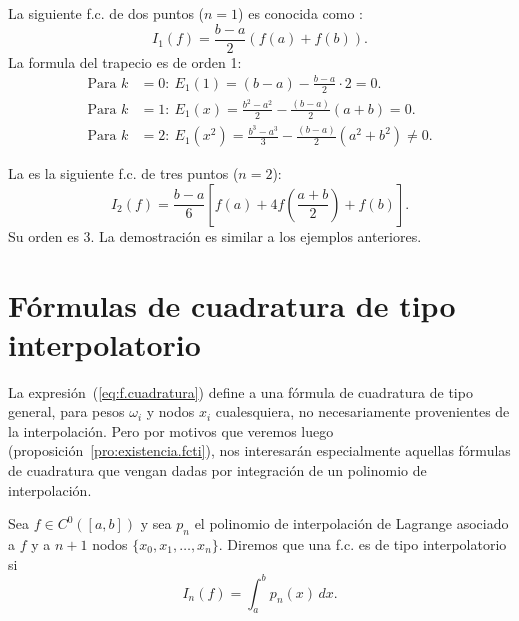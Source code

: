 \begin{example}
  \label{ex:formula-trapecio}
  La siguiente f.c. de dos puntos ($n=1$) es conocida
  como :
  \begin{equation*}
    I_1(f)= \frac{b-a}{2}\left(f(a)+f(b)\right).
  \end{equation*}
  La formula del trapecio es de orden 1:
  \begin{align*}
    \text{Para } k&=0:\ E_1(1) = (b-a) - \frac{b-a}2\cdot 2 = 0.
    \\
    \text{Para } k&=1:\ E_1(x) = \frac{b^2-a^2}{2} -
    \frac{(b-a)}{2}(a+b) = 0.
    \\
    \text{Para } k&=2:\ E_1(x^2) = \frac{b^3-a^3}{3} -
    \frac{(b-a)}{2}(a^2+b^2) \neq 0.
  \end{align*}
\end{example}

\begin{example}
  \label{ex:formula-simpson}
  La  es la siguiente f.c.
  de tres puntos ($n=2$):
  \begin{equation}
    I_2(f)= \frac{b-a}{6}\left[f(a)+4f
      \left(\frac{a+b}{2}\right)+f(b)\right].
    \label{eq:formula-simpson}
  \end{equation}
  Su orden es $3$. La demostración es similar a los ejemplos anteriores.
\end{example}

\section{Fórmulas de cuadratura de tipo interpolatorio}
\label{sec:cuadratura-interpolatorio}

La expresión~(\ref{eq:f.cuadratura}) define a una fórmula de
cuadratura de tipo general, para pesos $\omega_i$ y nodos $x_i$
cualesquiera, no necesariamente provenientes de la interpolación.
Pero por motivos que veremos luego
(proposición~\ref{pro:existencia.fcti}), nos interesarán especialmente
aquellas fórmulas de cuadratura que vengan dadas por integración de un
polinomio de interpolación.
\begin{definition}
  Sea $f\in C^0([a,b])$ y sea $p_n$ el polinomio de interpolación de
  Lagrange asociado a $f$ y a $n+1$ nodos
  $\{x_0,x_1,\dots,x_n\}$. Diremos que una f.c. es de tipo
  interpolatorio si 
  \begin{equation}
    \label{eq:fcti}
    I_n(f)=\int_a^b p_n(x)\, dx.
  \end{equation}
  \label{def:fcti}
\end{definition}

